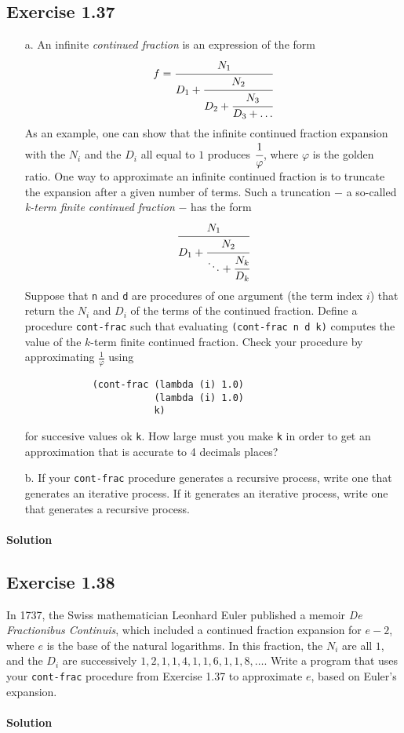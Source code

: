 \subsection*{Exercise 1.37}
\begin{itemize}
    \item[a.] An infinite \textit{continued fraction} is an expression of the form 
        \[ f = \cfrac{N_{1}}{D_{1} + \cfrac{N_{2}}{D_{2} + \cfrac{N_{3}}{D_{3} + \dots}}} \] 
        As an example, one can show that the infinite continued fraction expansion with the $ N_{i} $ and the $ D_{i} $
        all equal to $ 1 $ produces $ \cfrac{1}{\varphi} $, where $ \varphi $ is the golden ratio.
        One way to approximate an infinite continued fraction is to truncate the expansion after a given number of terms.
        Such a truncation $ - $ a so-called \textit{k-term finite continued fraction} $ - $ has the form
        \[ \cfrac{N_{1}}{D_{1} + \cfrac{N_{2}}{\ddots + \cfrac{N_{k}}{D_{k}}}} \]
        Suppose that \texttt{n} and \texttt{d} are procedures of one argument (the term index $ i $) that return the $ N_{i} $
        and $ D_{i} $ of the terms of the continued fraction.
        Define a procedure \texttt{cont-frac} such that evaluating \texttt{(cont-frac n d k)} computes the value of the $k$-term
        finite continued fraction. Check your procedure by approximating $ \frac{1}{\varphi} $ using
        \begin{lstlisting}
            (cont-frac (lambda (i) 1.0)
                       (lambda (i) 1.0)
                       k)
        \end{lstlisting} 
        for succesive values ok \texttt{k}. How large must you make \texttt{k} in order to get an approximation that is accurate
        to 4 decimals places?
    
    \item[b.] If your \texttt{cont-frac} procedure generates a recursive process, write one that generates an iterative process. If
        it generates an iterative process, write one that generates a recursive process.    
\end{itemize}

\paragraph{Solution}


\subsection*{Exercise 1.38}
In 1737, the Swiss mathematician Leonhard Euler published a memoir \textit{De Fractionibus Continuis}, which
included a continued fraction expansion for $ e - 2 $, where $ e $ is the base of the natural logarithms.
In this fraction, the $ N_{i} $ are all $ 1 $, and the $ D_{i} $ are successively $ 1, 2, 1, 1, 4, 1, 1, 6, 1, 1, 8, \dots $.
Write a program that uses your \texttt{cont-frac} procedure from Exercise 1.37 to approximate $ e $, based on Euler's expansion.

\paragraph{Solution}